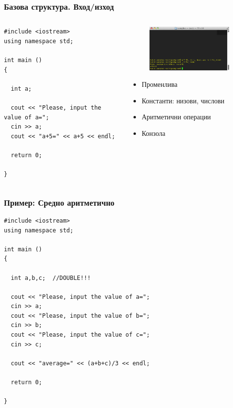 \documentclass{beamer}
\begin{document}
\begin{frame}[fragile]
\frametitle{Базова структура. Вход/изход}

\begin{columns}[t]
  \begin{column}{0.2\textwidth}
\begin{lstlisting}
#include <iostream>
using namespace std;

int main ()
{
  
  int a;

  cout << "Please, input the value of a=";
  cin >> a;
  cout << "a+5=" << a+5 << endl;

  return 0;

}
\end{lstlisting}

  \end{column}
  \begin{column}{0.8\textwidth}
\begin{figure}
\flushright
\includegraphics[width=6cm]{images/sample_inout}
\end{figure}
\begin{itemize}
\item Променлива
\item Константи: низови, числови
\item Аритметични операции
\item Конзола
\end{itemize}

  \end{column}
\end{columns}


\end{frame} 

\begin{frame}[fragile]
\frametitle{Пример: Средно аритметично}

\begin{lstlisting}
#include <iostream>
using namespace std;

int main ()
{
  
  int a,b,c;  //DOUBLE!!!

  cout << "Please, input the value of a=";
  cin >> a;
  cout << "Please, input the value of b=";
  cin >> b;
  cout << "Please, input the value of c=";
  cin >> c;
  
  cout << "average=" << (a+b+c)/3 << endl;

  return 0;

}
\end{lstlisting}

\end{frame} 
\end{document}
